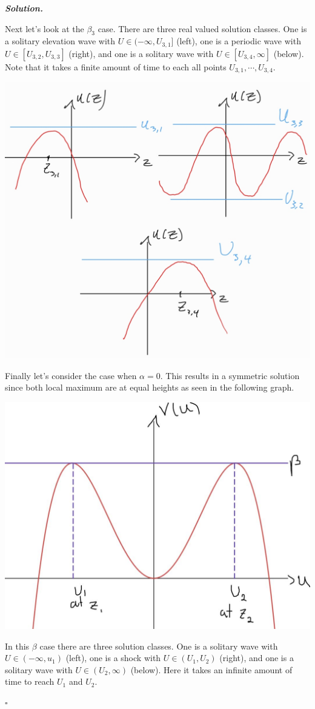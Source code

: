 \documentclass[12pt]{report}
\newenvironment{solution}[1][\it{Solution}]{\textbf{#1. } }{$\square$}
\begin{document}
\begin{solution}
\begin{enumerate}
        \noindent
        Next let's look at the $\beta_3$ case. There are three real valued solution classes. One is a solitary elevation wave with $U \in (-\infty, U_{3,1}]$ (left), one is a periodic wave with $U \in [U_{3,2},U_{3,3}]$ (right), and one is a solitary wave with $U \in [U_{3,4},\infty]$ (below). Note that it takes a finite amount of time to each all points $U_{3,1}, \cdots, U_{3,4}$.

        \begin{center}
            \includegraphics[width=.6\textwidth]{plots/4b-set2.jpg}
        \end{center}

        \noindent
        Finally let's consider the case when $\alpha = 0$. This results in a symmetric solution since both local maximum are at equal heights as seen in the following graph.
        \begin{center}
            \includegraphics[width=.6\textwidth]{plots/4b-sym.jpg}
        \end{center}
        In this $\beta$ case there are three solution classes. One is a solitary wave with $U \in (-\infty, u_1)$ (left), one is a shock with $U \in (U_1,U_2)$ (right), and one is a solitary wave with $U \in (U_2, \infty)$ (below). Here it takes an infinite amount of time to reach $U_1$ and $U_2$.


\end{enumerate}
\end{solution}
\end{document}
